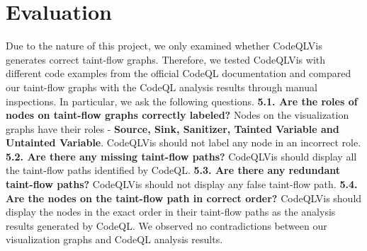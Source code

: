 \documentclass[sigplan,10pt,review]{acmart}
\begin{document}
\section{Evaluation}
Due to the nature of this project, we only examined whether CodeQLVis generates correct taint-flow graphs. Therefore, we tested CodeQLVis with different code examples from the official CodeQL documentation and compared our taint-flow graphs with the CodeQL analysis results through manual inspections. In particular, we ask the following questions.
\newline
\newline
\textbf{5.1. Are the roles of nodes on taint-flow graphs correctly labeled? }
\newline
Nodes on the visualization graphs have their roles - \textbf{Source, Sink, Sanitizer, Tainted Variable and Untainted Variable}. CodeQLVis should not label any node in an incorrect role.
\newline
\newline
\textbf{5.2. Are there any missing taint-flow paths? }
\newline
CodeQLVis should display all the taint-flow paths identified by CodeQL.
\newline
\newline
\textbf{5.3. Are there any redundant taint-flow paths? }
\newline
CodeQLVis should not display any false taint-flow path.
\newline
\newline
\textbf{5.4. Are the nodes on the taint-flow path in correct order? }
\newline
CodeQLVis should display the nodes in the exact order in their taint-flow paths as the analysis results generated by CodeQL.
\newline
\newline
We observed no contradictions between our visualization graphs and CodeQL analysis results.
\end{document}
